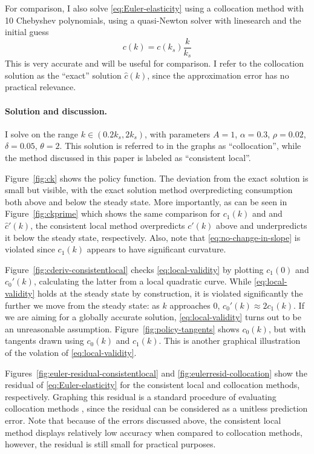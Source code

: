 \documentclass[a4paper,11pt]{article}
\newcommand{\hc}{\hat{c}}
\begin{document}
For comparison, I also solve \eqref{eq:Euler-elasticity} using a collocation method with 10 Chebyshev polynomials, using a quasi-Newton solver with linesearch and the initial guess
\begin{equation}
  \label{eq:linear-policy-guess}
  c(k) = c(k_s) \frac{k}{k_s}
\end{equation}
This is very accurate and will be useful for comparison. I refer to the collocation solution as the ``exact'' solution $\hc(k)$, since the approximation error has no practical relevance.

\paragraph{Solution and discussion.}

I solve on the range $k \in (0.2 k_s, 2 k_s)$, with parameters $A=1$, $\alpha=0.3$, $\rho=0.02$, $\delta=0.05$, $\theta=2$.  This solution is referred to in the graphs as ``collocation'', while the method discussed in this paper is labeled as ``consistent local''.

Figure~\ref{fig:ck} shows the policy function. The deviation from the exact solution is small but visible, with the exact solution method overpredicting consumption both above and below the steady state. More importantly, as can be seen in Figure~\ref{fig:ckprime} which shows the same comparison for $c_1(k)$ and and $\hc'(k)$, the consistent local method overpredicts $c'(k)$ above and underpredicts it below the steady state, respectively. Also, note that \eqref{eq:no-change-in-slope} is violated since $c_1(k)$ appears to have significant curvature.

Figure~\ref{fig:cderiv-consistentlocal} checks \eqref{eq:local-validity} by plotting $c_1(0)$ and $c_0'(k)$, calculating the latter from a local quadratic curve. While \eqref{eq:local-validity} holds at the steady state by construction, it is violated significantly the further we move from the steady state: as $k$ approaches $0$, $c_0'(k) \approx 2 c_1(k)$. If we are aiming for a globally accurate solution, \eqref{eq:local-validity} turns out to be an unreasonable assumption. Figure~\ref{fig:policy-tangents} shows $c_0(k)$, but with tangents drawn using $c_0(k)$ and $c_1(k)$. This is another graphical illustration of the volation of \eqref{eq:local-validity}.

Figures~\ref{fig:euler-residual-consistentlocal} and \ref{fig:eulerresid-collocation} show the residual of \eqref{eq:Euler-elasticity} for the consistent local and collocation methods, respectively. Graphing this residual is a standard procedure of evaluating collocation methods \parencite{boyd2001chebyshev, judd98:_numer_method_in_econom}, since the residual can be considered as a unitless prediction error. Note that because of the errors discussed above, the consistent local method displays relatively low accuracy when compared to collocation methods, however, the residual is still small for practical purposes.
\end{document}
